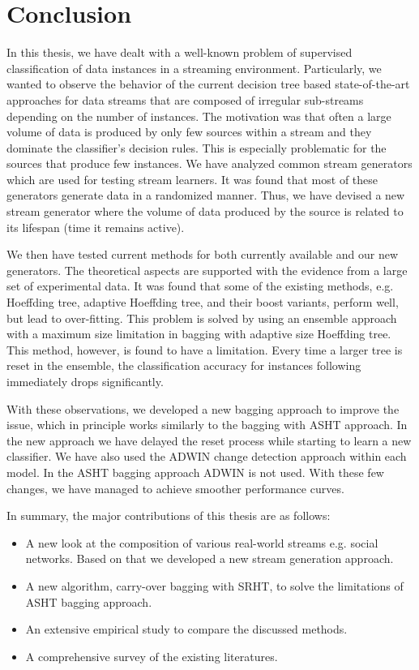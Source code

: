 \chapter{Conclusion}
\label{chp:conclude}

In this thesis, we have dealt with a well-known problem of supervised classification of data instances in a streaming environment. Particularly, we wanted to observe the behavior of the current decision tree based state-of-the-art approaches for data streams that are composed of irregular sub-streams depending on the number of instances. The motivation was that often a large volume of data is produced by only few sources within a stream and they dominate the classifier's decision rules. This is especially problematic for the sources that produce few instances. We have analyzed common stream generators which are used for testing stream learners. It was found that most of these generators generate data in a randomized manner. Thus, we have devised a new stream generator where the volume of data produced by the source is  related to its lifespan (time it remains active). 

We then have tested current methods for both currently available and our new generators. The theoretical aspects are supported with the evidence from a large set of experimental data. It was found that some of the existing methods, e.g. Hoeffding tree, adaptive Hoeffding tree, and their boost variants, perform well, but lead to over-fitting. This problem is solved by using an ensemble approach with a maximum size limitation in bagging with adaptive size Hoeffding tree. This method, however, is found to have a limitation. Every time a larger tree is reset in the ensemble, the classification accuracy for instances following immediately drops significantly. 

With these observations, we developed a new bagging approach  to improve the issue, which in principle works similarly to the bagging with ASHT approach. In the new approach we have delayed the reset process while starting to learn a new classifier. We have also used the ADWIN change detection approach within each model. In the ASHT bagging approach ADWIN is not used. With these few changes, we have managed to achieve smoother performance curves.

In summary, the major contributions of this thesis are as follows:

\begin{itemize}
    \item A new look at the composition of various real-world streams e.g. social networks. Based on that we developed a new stream generation approach.
    
    \item A new algorithm, carry-over bagging with SRHT, to solve the limitations of ASHT bagging approach.
    
    \item An extensive empirical study to compare the discussed methods.
    
    \item A comprehensive survey of the existing literatures.
\end{itemize}

